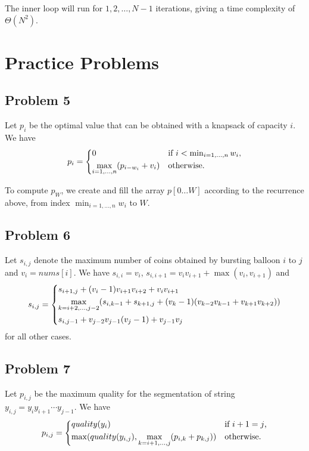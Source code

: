 \documentclass{article}
\begin{document}
The inner loop will run for $1, 2, \dots, N - 1$ iterations, giving a time complexity of $\Theta(N^2)$.

\section*{Practice Problems}

\subsection*{Problem 5}

Let $p_i$ be the optimal value that can be obtained with a knapsack of capacity $i$. We have
\[
    p_i = \begin{dcases*}
        0 & if $i < \min_{i = 1, \dots, n} w_i$,\\
        \max_{i = 1, \dots, n} (p_{i - w_i} + v_i) & otherwise.\\
    \end{dcases*}
\]

To compute $p_W$, we create and fill the array $p[0\dots W]$ according to the recurrence above, from index $\min_{i = 1, \dots, n} w_i$ to $W$.

\subsection*{Problem 6}

Let $s_{i, j}$ denote the maximum number of coins obtained by bursting balloon $i$ to $j$ and $v_i = nums[i]$. We have $s_{i, i} = v_i$, $s_{i, i + 1} = v_iv_{i + 1} + \max(v_i, v_{i + 1})$ and
\[
    s_{i, j} = \begin{dcases*}
        s_{i + 1, j} + (v_i - 1)v_{i + 1}v_{i + 2} + v_iv_{i + 1}\\
        \max_{k = i + 2, \dots, j - 2} (s_{i, k - 1} + s_{k + 1, j} + (v_k - 1)(v_{k - 2}v_{k - 1} + v_{k + 1}v_{k + 2}))\\
        s_{i, j - 1} + v_{j - 2}v_{j - 1}(v_j - 1) + v_{j - 1}v_j
    \end{dcases*}
\]
for all other cases.

\subsection*{Problem 7}

Let $p_{i, j}$ be the maximum quality for the segmentation of string $y_{i, j} = y_iy_{i + 1}{\cdots}y_{j - 1}$. We have
\[
    p_{i, j} = \begin{dcases*}
        quality(y_i) & if $i + 1 = j$,\\
        \max(quality(y_{i, j}), \max_{k = i + 1, \dots, j}(p_{i, k} + p_{k, j})) & otherwise.
    \end{dcases*}
\]
\end{document}
